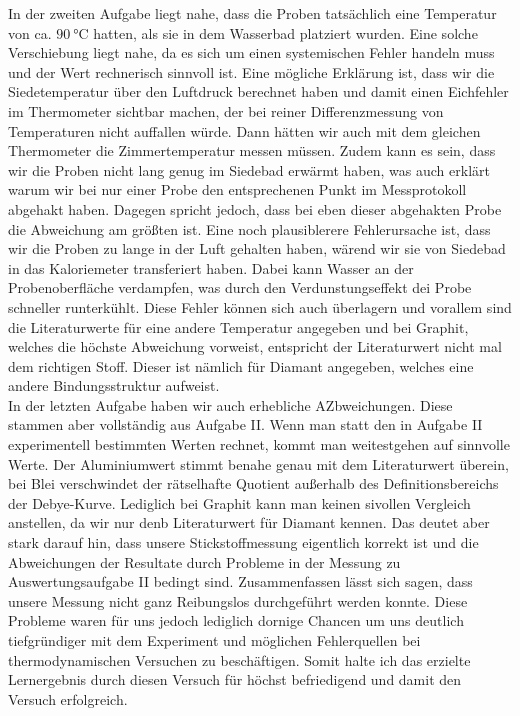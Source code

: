 \documentclass{article}
\begin{document}
In der zweiten Aufgabe liegt nahe, dass die Proben tatsächlich eine Temperatur von ca. $\qty{90}{\degreeCelsius}$ hatten,
als sie in dem Wasserbad platziert wurden. Eine solche Verschiebung liegt nahe, da es sich um einen systemischen 
Fehler handeln muss und der Wert rechnerisch sinnvoll ist. Eine mögliche Erklärung ist, dass wir die Siedetemperatur
über den Luftdruck berechnet haben und damit einen Eichfehler im Thermometer sichtbar machen, der bei reiner
Differenzmessung von Temperaturen nicht auffallen würde. Dann hätten wir auch mit dem gleichen Thermometer die
Zimmertemperatur messen müssen. 
Zudem kann es sein, dass wir die Proben nicht lang genug im Siedebad erwärmt haben, was auch erklärt warum wir bei nur
einer Probe den entsprechenen Punkt im Messprotokoll abgehakt haben. Dagegen spricht jedoch, dass bei eben dieser
abgehakten Probe die Abweichung am größten ist.
Eine noch plausiblerere Fehlerursache ist, dass wir die Proben zu lange in der
Luft gehalten haben, wärend wir sie von Siedebad in das Kaloriemeter transferiert haben. Dabei kann Wasser an der
Probenoberfläche verdampfen, was durch den Verdunstungseffekt dei Probe schneller runterkühlt.
Diese Fehler können sich auch überlagern und vorallem sind die Literaturwerte für eine andere Temperatur angegeben
und bei Graphit, welches die höchste Abweichung vorweist, entspricht der Literaturwert nicht mal dem richtigen Stoff.
Dieser ist nämlich für Diamant angegeben, welches eine andere Bindungsstruktur aufweist.\\
In der letzten Aufgabe haben wir auch erhebliche AZbweichungen. Diese stammen aber vollständig aus Aufgabe II. Wenn
man statt den in Aufgabe II experimentell bestimmten Werten rechnet, kommt man weitestgehen auf sinnvolle Werte. Der
Aluminiumwert stimmt benahe genau mit dem Literaturwert überein, bei Blei verschwindet der rätselhafte Quotient außerhalb
des Definitionsbereichs der Debye-Kurve. Lediglich bei Graphit kann man keinen sivollen Vergleich anstellen, da wir nur
denb Literaturwert für Diamant kennen. Das deutet aber stark darauf hin, dass unsere Stickstoffmessung eigentlich korrekt
ist und die Abweichungen der Resultate durch Probleme in der Messung zu Auswertungsaufgabe II bedingt sind.
Zusammenfassen lässt sich sagen, dass unsere Messung nicht ganz Reibungslos durchgeführt werden konnte. Diese Probleme
waren für uns jedoch lediglich dornige Chancen um uns deutlich tiefgründiger mit dem Experiment und möglichen Fehlerquellen
bei thermodynamischen Versuchen zu beschäftigen. Somit halte ich das erzielte Lernergebnis durch diesen Versuch für höchst 
befriedigend und damit den Versuch erfolgreich.
\end{document}
